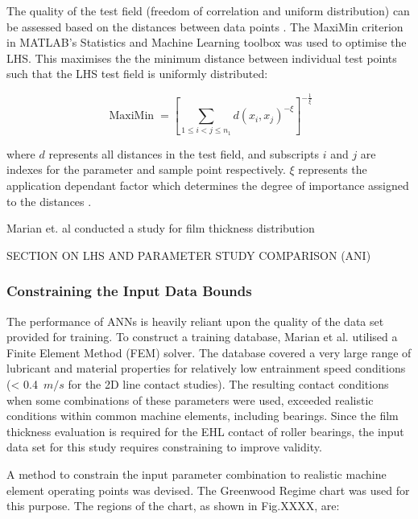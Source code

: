 The quality of the test field (freedom of correlation and uniform distribution) can be assessed based on the distances between data points \cite{Johnson1990}. The MaxiMin criterion in MATLAB's Statistics and Machine Learning toolbox was used to optimise the LHS. This maximises the the minimum distance between individual test points such that the LHS test field is uniformly distributed:

\begin{equation}\label{maximin}
	\operatorname{MaxiMin}=\left[\sum_{1 \leq i<j \leq n_1} d\left(x_i, x_j\right)^{-\xi}\right]^{-\frac{1}{\xi}}
\end{equation}

where $d$ represents all distances in the test field, and subscripts $i$ and $j$ are indexes for the parameter and sample point respectively. $\xi$ represents the application dependant factor which determines the degree of importance assigned to the distances \cite{Siebertz2010}.



Marian et. al conducted a study for film thickness distribution


SECTION ON LHS AND PARAMETER STUDY COMPARISON (ANI)



\subsubsection{Constraining the Input Data Bounds}

The performance of ANNs is heavily reliant upon the quality of the data set provided for training. To construct a training database, Marian et al. \cite{Marian2022} utilised a Finite Element Method (FEM) solver. The database covered a very large range of lubricant and material properties for relatively low entrainment speed conditions (< 0.4~$m/s$ for the 2D line contact studies). The resulting contact conditions when some combinations of these parameters were used, exceeded realistic conditions within common machine elements, including bearings. Since the film thickness evaluation is required for the EHL contact of roller bearings, the input data set for this study requires constraining to improve validity.

A method to constrain the input parameter combination to realistic machine element operating points was devised. The Greenwood Regime chart \cite{Johnson1970} was used for this purpose. The regions of the chart, as shown in Fig.XXXX, are:

